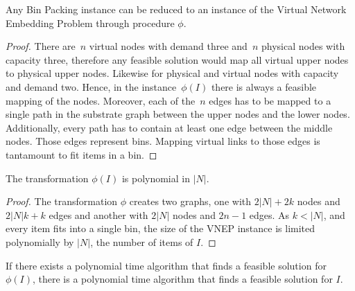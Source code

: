 \begin{lemma} \label{lem:reduction}
  Any Bin Packing instance can be reduced to an instance of the Virtual Network Embedding Problem through procedure $\phi$.
\end{lemma}

\begin{proof}
There are~$n$ virtual nodes with demand three and~$n$ physical nodes with capacity three, therefore any feasible solution would map all virtual upper nodes to physical upper nodes. Likewise for physical and virtual nodes with capacity and demand two.
Hence, in the instance~$\phi(I)$ there is always a feasible mapping of the nodes.
Moreover, each of the~$n$ edges has to be mapped to a single path in the substrate graph between the upper nodes and the lower nodes.
Additionally, every path has to contain at least one edge between the middle nodes.
Those edges represent bins.
Mapping virtual links to those edges is tantamount to fit items in a bin.
\end{proof}


\begin{lemma} \label{lem:transpol}
  The transformation $\phi(I)$ is polynomial in $|N|$.
\end{lemma}

\begin{proof}
The transformation $\phi$ creates two graphs, one with $2|N| + 2k$ nodes and $2|N|k + k$ edges and another with $2|N|$ nodes and $2n - 1$ edges. 
As $k < |N|$, and every item fits into a single bin, the size of the VNEP instance is limited polynomially by $|N|$, the number of items of $I$.
\end{proof}

\begin{lemma} \label{lem:polapp}
  If there exists a polynomial time algorithm that finds a feasible solution for $\phi(I)$, there is a polynomial time algorithm that finds a feasible solution for $I$.
\end{lemma}

